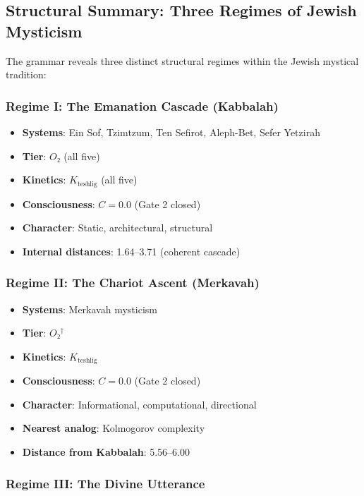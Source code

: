 \documentclass[12pt,a4paper]{article}
\begin{document}
\subsection{Structural Summary: Three Regimes of Jewish Mysticism}

The grammar reveals three distinct structural regimes within the Jewish mystical tradition:

\subsubsection{Regime I: The Emanation Cascade (Kabbalah)}

\begin{itemize}
    \item \textbf{Systems}: Ein Sof, Tzimtzum, Ten Sefirot, Aleph-Bet, Sefer Yetzirah
    \item \textbf{Tier}: $O₂$ (all five)
    \item \textbf{Kinetics}: $K_{\text{teshlig}}$ (all five)
    \item \textbf{Consciousness}: $C = 0.0$ (Gate 2 closed)
    \item \textbf{Character}: Static, architectural, structural
    \item \textbf{Internal distances}: 1.64--3.71 (coherent cascade)
\end{itemize}

\subsubsection{Regime II: The Chariot Ascent (Merkavah)}

\begin{itemize}
    \item \textbf{Systems}: Merkavah mysticism
    \item \textbf{Tier}: $O₂^\dagger$
    \item \textbf{Kinetics}: $K_{\text{teshlig}}$
    \item \textbf{Consciousness}: $C = 0.0$ (Gate 2 closed)
    \item \textbf{Character}: Informational, computational, directional
    \item \textbf{Nearest analog}: Kolmogorov complexity
    \item \textbf{Distance from Kabbalah}: 5.56--6.00
\end{itemize}

\subsubsection{Regime III: The Divine Utterance}
\end{document}
